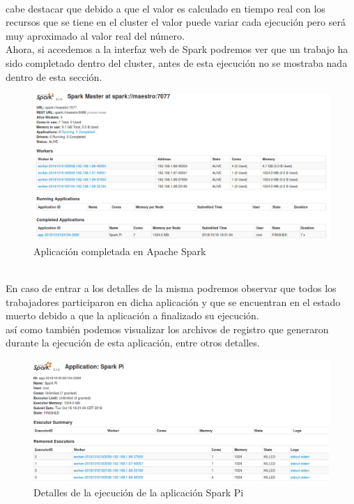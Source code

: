 \\ cabe destacar que debido a que el valor es calculado en tiempo real con los recursos que se tiene en el cluster el valor puede variar cada ejecución pero será muy aproximado al valor real del número.
\\
Ahora, si accedemos a la interfaz web de Spark podremos ver que un trabajo ha sido completado dentro del cluster, antes de esta ejecución no se mostraba nada dentro de esta sección. \\
\begin{figure}[!htbp]
	\hypertarget{fig:red6}{\hspace{1pt}}
	\begin{center}
		\includegraphics[width=.7\textwidth]{capitulo3/images/im6.png}
		\caption{Aplicación completada en Apache Spark}
		\label{fig:red6}
	\end{center}
\end{figure}
\\ En caso de entrar a los detalles de la misma podremos observar que todos los trabajadores participaron en dicha aplicación y que se encuentran en el estado muerto debido a que la aplicación a finalizado su ejecución. 
\\ así como también podemos visualizar los archivos de registro que generaron durante la ejecución de esta aplicación, entre otros detalles.
\begin{figure}[!htbp]
	\hypertarget{fig:red7}{\hspace{1pt}}
	\begin{center}
		\includegraphics[width=.7\textwidth]{capitulo3/images/im10.png}
		\caption{Detalles de la ejecución de la aplicación Spark Pi}
		\label{fig:red7}
	\end{center}
\end{figure}
